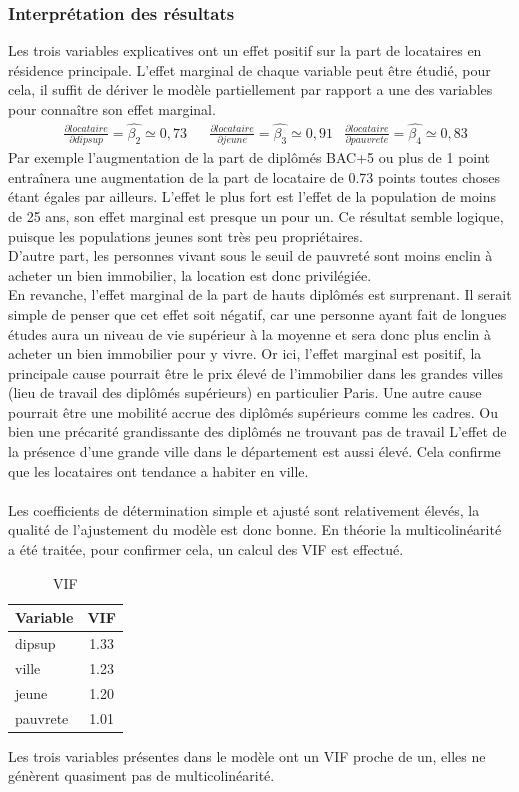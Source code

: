 \documentclass{article}
\begin{document}
\subsubsection{Interprétation des résultats}\label{sec:result}
Les trois variables explicatives ont un effet positif sur la part de locataires en résidence principale. L'effet marginal de chaque variable peut être étudié, pour cela,
il suffit de dériver le modèle partiellement par rapport a une des variables pour connaître son effet marginal.
\begin{align*}
    &\frac{\partial locataire}{\partial dipsup} = \hat{\beta_2} \simeq 0,73 & &\frac{\partial locataire}{\partial jeune} = \hat{\beta_3} \simeq 0,91 &\frac{\partial locataire}{\partial pauvrete} = \hat{\beta_4} \simeq 0,83
\end{align*}
Par exemple l'augmentation de la part de diplômés BAC+5 ou plus de 1 point entraînera une augmentation de la part de locataire de 0.73 points toutes choses étant égales par ailleurs.
L'effet le plus fort est l'effet de la population de moins de 25 ans, son effet marginal est presque un pour un. Ce résultat semble logique, puisque les populations jeunes sont très peu
propriétaires\cite{insee_portrait_social}.
\\
D'autre part, les personnes vivant sous le seuil de pauvreté sont moins enclin à acheter un bien immobilier, la location est donc privilégiée.
\\
En revanche, l'effet marginal de la part de hauts diplômés est surprenant. Il serait simple de penser que cet effet soit négatif, car une personne ayant fait de longues études aura un niveau
de vie supérieur à la moyenne et sera donc plus enclin à acheter un bien immobilier pour y vivre. Or ici, l'effet marginal est positif, la principale cause pourrait être le prix élevé de l'immobilier dans les grandes villes (lieu de travail des diplômés supérieurs) en particulier Paris\cite{prix_immo_paris}. Une autre cause pourrait être une mobilité accrue des diplômés
supérieurs comme les cadres. Ou bien une précarité grandissante des diplômés ne trouvant pas de travail\cite{precarite_etude_sup}
L'effet de la présence d'une grande ville dans le département est aussi élevé. Cela confirme que les locataires ont tendance a habiter en ville.
\\ \\
Les coefficients de détermination simple et ajusté sont relativement élevés, la qualité de l'ajustement du modèle est donc bonne. En théorie la
multicolinéarité a été traitée, pour confirmer cela, un calcul des VIF est effectué.
\begin{table}[H]
\centering
\caption{VIF}
\begin{tabular}{l*{1}{c}}
\toprule
Variable            &         VIF\\
\midrule
dipsup  &  1.33  \\
ville   &  1.23  \\
jeune   &  1.20  \\
pauvrete&  1.01  \\
\bottomrule
\end{tabular}
\end{table}
Les trois variables présentes dans le modèle ont un VIF proche de un, elles ne génèrent quasiment pas de multicolinéarité.
\end{document}
